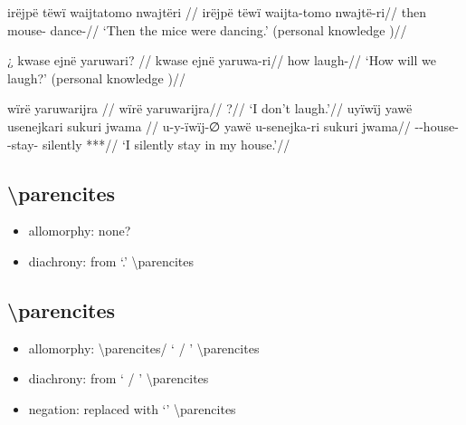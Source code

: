 \documentclass{memoir}
\begin{document}
\ex \label{ctorat-16}
\begingl \glpreamble irëjpë tëwï waijtatomo nwajtëri //
\gla irëjpë tëwï waijta-tomo nwajtë-ri//
\glb then  mouse- dance-//
\glft ‘Then the mice were dancing.’ (personal knowledge
)//
\endgl
\xe

\ex \label{convrisamaj-6}
\begingl \glpreamble ¿ kwase ejnë yaruwari? //
\gla kwase ejnë yaruwa-ri//
\glb how  laugh-//
\glft ‘How will we laugh?’ (personal knowledge
)//
\endgl
\xe

\pex\label{gnomicri}    \a     \label{convrisamaj-4}        \begingl
        \glpreamble wïrë yaruwarijra //
        \gla wïrë yaruwarijra//
        \glb {} ?//
            \glft ‘I don’t laugh.’//  
        \endgl 
    \a     \label{convrisamaj-28}        \begingl
        \glpreamble uyïwïj yawë usenejkari sukuri jwama //
        \gla u-y-ïwïj-∅ yawë u-senejka-ri sukuri jwama//
        \glb {}--house-  -stay- silently ***//
            \glft ‘I silently stay in my house.’//  
        \endgl 
\xe

\subsection{\texorpdfstring{
\textbackslash parencites}{ \textbackslash parencites}}

\begin{itemize}
\tightlist
\item
  allomorphy: none?
\item
  diachrony: from  `.'
  \textbackslash parencites
\end{itemize}

\subsection{\texorpdfstring{
\textbackslash parencites}{ \textbackslash parencites}}

\begin{itemize}
\tightlist
\item
  allomorphy:  \textbackslash parencites/ `
  / ' \textbackslash parencites
\item
  diachrony: from  ` / '
  \textbackslash parencites
\item
  negation: replaced with  `' \textbackslash parencites
\end{itemize}
\end{document}

